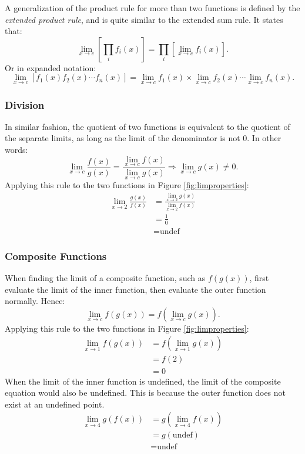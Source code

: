 \documentclass[12pt]{article}
\begin{document}
A generalization of the product rule for more than two functions is defined by the \textit{extended product rule}, and is quite similar to the extended sum rule. It states that:
\[ \lim_{x \to c} \left[ \prod_i f_i(x) \right] = \prod_i \left[ \lim_{x \to c} f_i(x) \right]. \]
Or in expanded notation:
\[ \lim_{x \to c} \left[ f_1(x) f_2(x) \cdots f_n(x) \right] = \lim_{x \to c} f_1(x) \times \lim_{x \to c} f_2(x) \cdots \lim_{x \to c} f_n(x). \]

\subsubsection{Division}
In similar fashion, the quotient of two functions is equivalent to the quotient of the separate limits, as long as the limit of the denominator is not $0$. In other words:
\[ \lim_{x \to c} \frac{f(x)}{g(x)} = \frac{\lim_{x \to c} f(x)}{\lim_{x \to c} g(x)} \Rightarrow \lim_{x \to c} g(x) \ne 0. \]
Applying this rule to the two functions in Figure \ref{fig:limproperties}:
\begin{align*}
	\lim_{x \to 2} \frac{g(x)}{f(x)} &= \frac{\lim_{x \to 2} g(x)}{\lim_{x \to 2} f(x)} \\
	&= \frac{1}{0} \\
	&= \text{undef}
\end{align*}

\subsubsection{Composite Functions}
When finding the limit of a composite function, such as $f\left( g(x) \right)$, first evaluate the limit of the inner function, then evaluate the outer function normally. Hence:
\[ \lim_{x \to c} f\left( g(x) \right) = f\left( \lim_{x \to c} g(x) \right). \]
Applying this rule to the two functions in Figure \ref{fig:limproperties}:
\begin{align*}
	\lim_{x \to 1} f\left( g(x) \right) &= f\left( \lim_{x \to 1} g(x) \right) \\
	&= f(2) \\
	&= 0
\end{align*}
When the limit of the inner function is undefined, the limit of the composite equation would also be undefined. This is because the outer function does not exist at an undefined point.
\begin{align*}
	\lim_{x \to 4} g\left( f(x) \right) &= g\left( \lim_{x \to 4} f(x) \right) \\
	&= g(\text{undef}) \\
	&= \text{undef}
\end{align*}
\end{document}
